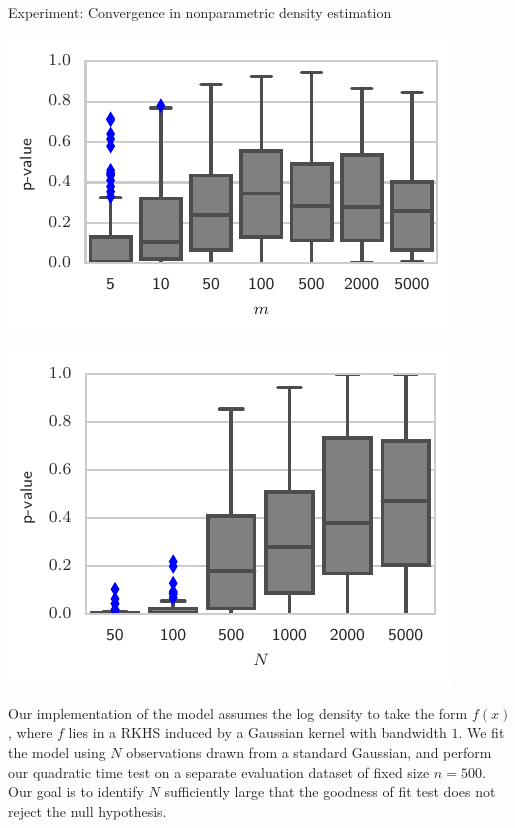 \begin{frame}
\begin{columns}
\begin{column}{.32\linewidth}
\begin{block}{Experiment: Convergence in nonparametric density estimation}
\begin{center}
\begin{minipage}{.450\linewidth}
\includegraphics[width=\textwidth]{../../presentation/img/increasing_features_fixed_test}\\
\end{minipage}
\begin{minipage}{.45\linewidth}
            \includegraphics[width=\textwidth]{../../presentation/img/increasing_data_fixed_test}
\end{minipage}
\end{center}

\footnotesize
Our implementation of the model assumes
the log density to take the form $f(x)$, where $f$ lies in a RKHS
induced by a Gaussian kernel with bandwidth $1$. We fit the model
using $N$ observations drawn from a standard Gaussian, and perform
our quadratic time test on a separate evaluation dataset of fixed
size $n=500$. Our goal is to identify $N$ sufficiently large that
the goodness of fit test does not reject the null hypothesis.


\end{block}
\end{column}
\end{columns}
\end{frame}
